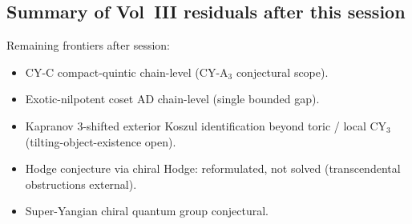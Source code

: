 \documentclass[11pt]{article}
\begin{document}
\subsection{Summary of Vol~III residuals after this session}

Remaining frontiers after session:
\begin{itemize}
\item CY-C compact-quintic chain-level (CY-A$_3$ conjectural scope).
\item Exotic-nilpotent coset AD chain-level (single bounded gap).
\item Kapranov 3-shifted exterior Koszul identification beyond
toric / local CY$_3$ (tilting-object-existence open).
\item Hodge conjecture via chiral Hodge: reformulated, not solved
(transcendental obstructions external).
\item Super-Yangian chiral quantum group conjectural.
\end{itemize}
\end{document}
